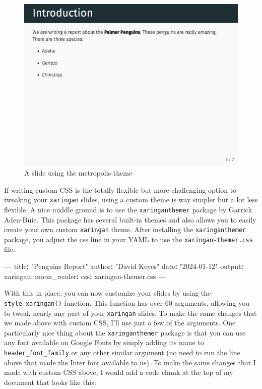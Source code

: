 \documentclass[
]{book}
\newenvironment{Shaded}{\begin{snugshade}}{\end{snugshade}}
\newcommand{\AttributeTok}[1]{\textcolor[rgb]{0.77,0.63,0.00}{#1}}
\newcommand{\FunctionTok}[1]{\textcolor[rgb]{0.00,0.00,0.00}{#1}}
\newcommand{\KeywordTok}[1]{\textcolor[rgb]{0.13,0.29,0.53}{\textbf{#1}}}
\newcommand{\PreprocessorTok}[1]{\textcolor[rgb]{0.56,0.35,0.01}{\textit{#1}}}
\newcommand{\StringTok}[1]{\textcolor[rgb]{0.31,0.60,0.02}{#1}}
\begin{document}
\begin{figure}
\includegraphics[width=1\linewidth]{assets/xaringan-metropolis} \caption{A slide using the metropolis theme}\label{fig:xaringan-metropolis}
\end{figure}

If writing custom CSS is the totally flexible but more challenging option to tweaking your \texttt{xaringan} slides, using a custom theme is way simpler but a lot less flexible. A nice middle ground is to use the \texttt{xaringanthemer} package by Garrick Aden-Buie. This package has several built-in themes and also allows you to easily create your own custom \texttt{xaringan} theme. After installing the \texttt{xaringanthemer} package, you adjust the css line in your YAML to use the \texttt{xaringan-themer.css} file.

\begin{Shaded}
\begin{Highlighting}[]
\PreprocessorTok{{-}{-}{-}}
\FunctionTok{title}\KeywordTok{:}\AttributeTok{ }\StringTok{"Penguins Report"}
\FunctionTok{author}\KeywordTok{:}\AttributeTok{ }\StringTok{"David Keyes"}
\FunctionTok{date}\KeywordTok{:}\AttributeTok{ }\StringTok{"2024{-}01{-}12"}
\FunctionTok{output}\KeywordTok{:}
\AttributeTok{  xaringan:}\FunctionTok{:moon\_reader}\KeywordTok{:}
\AttributeTok{    }\FunctionTok{css}\KeywordTok{:}\AttributeTok{ xaringan{-}themer.css}
\PreprocessorTok{{-}{-}{-}}
\end{Highlighting}
\end{Shaded}

With this in place, you can now customize your slides by using the \texttt{style\_xaringan()} function. This function has over 60 arguments, allowing you to tweak nearly any part of your \texttt{xaringan} slides. To make the same changes that we made above with custom CSS, I'll use just a few of the arguments. One particularly nice thing about the \texttt{xaringanthemer} package is that you can use any font available on Google Fonts by simply adding its name to \texttt{header\_font\_family} or any other similar argument (no need to run the line above that made the Inter font available to us). To make the same changes that I made with custom CSS above, I would add a code chunk at the top of my document that looks like this:
\end{document}
